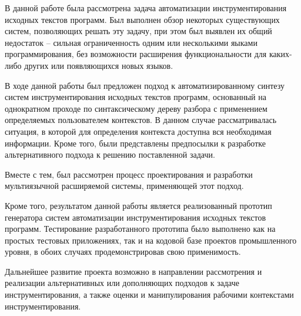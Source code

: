 \conclusion

В данной работе была рассмотрена задача автоматизации инструментирования исходных текстов программ.
Был выполнен обзор некоторых существующих систем, позволяющих решать эту задачу, при этом был выявлен их общий недостаток -- сильная ограниченность одним или несколькими яыками программирования, без возможности расширения функциональности для каких-либо других или появляющихся новых языков.

В ходе данной работы был предложен подход к автоматизированному синтезу систем инструментирования исходных текстов программ, основанный на однократном проходе по синтаксическому дереву разбора с применением определяемых пользователем контекстов.
В данном случае рассматривалась ситуация, в которой для определения контекста доступна вся необходимая информации.
Кроме того, были представлены предпосылки к разработке альтернативного подхода к решению поставленной задачи.

Вместе с тем, был рассмотрен процесс проектирования и разработки мультиязычной расширяемой системы, применяющей этот подход.

Кроме того, результатом данной работы является реализованный прототип генератора систем автоматизации инструментирования исходных текстов программ.
Тестирование разработанного прототипа было выполнено как на простых тестовых приложениях, так и на кодовой базе проектов промышленного уровня, в обоих случаях продемонстрировав свою применимость.

Дальнейшее развитие проекта возможно в направлении рассмотрения и реализации альтернативных или дополняющих подходов к задаче инструментирования, а также оценки и манипулирования рабочими контекстами инструментирования.
